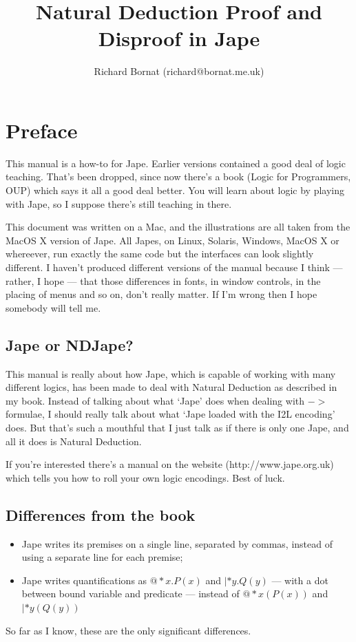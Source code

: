 \documentclass[11pt]{book}
\title{\huge Natural Deduction Proof and Disproof in Jape}
\author{Richard Bornat (richard@bornat.me.uk)}
\begin{document}
\maketitle

\chapter*{Preface}

This manual is a how-to for Jape. Earlier versions contained a good deal of logic teaching. That's been dropped, since now there's a book (Logic for Programmers, OUP) which says it all a good deal better. You will learn about logic by playing with Jape, so I suppose there's still teaching in there.

This document was written on a Mac, and the illustrations are all taken from the MacOS X version of Jape. All Japes, on Linux, Solaris, Windows, MacOS X or whereever, run exactly the same code but the interfaces can look slightly different. I haven't produced different versions of the manual because I think --- rather, I hope --- that those differences in fonts, in window controls, in the placing of menus and so on, don't really matter. If I'm wrong then I hope somebody will tell me.

\section*{Jape or NDJape?}

This manual is really about how Jape, which is capable of working with many different logics, has been made to deal with Natural Deduction as described in my book. Instead of talking about what `Jape' does when dealing with $->$ formulae, I should really talk about what `Jape loaded with the I2L encoding' does. But that's such a mouthful that I just talk as if there is only one Jape, and all it does is Natural Deduction.

If you're interested there's a manual on the website (http://www.jape.org.uk) which tells you how to roll your own logic encodings. Best of luck.

\section{Differences from the book}
\begin{itemize}
\item Jape writes its premises on a single line, separated by commas, instead of using a separate line for each premise;
\item Jape writes quantifications as $@*x.P(x)$ and $|*y.Q(y)$ --- with a dot between bound variable and predicate --- instead of $@*x(P(x))$ and $|*y(Q(y))$
\end{itemize}
So far as I know, these are the only significant differences.
\end{document}
